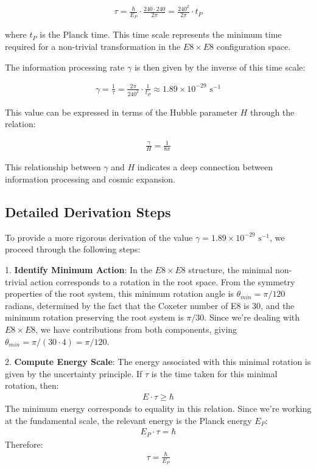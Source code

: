 \documentclass[11pt,english,twoside]{article}
\begin{document}
\begin{align}
    \tau = \frac{\hbar}{E_P} \cdot \frac{240 \cdot 240}{2\pi} = \frac{240^2}{2\pi} \cdot t_P
\end{align}

where $t_P$ is the Planck time. This time scale represents the minimum time required for a non-trivial transformation in the $E8\times E8$ configuration space.

The information processing rate $\gamma$ is then given by the inverse of this time scale:

\begin{align}
    \gamma = \frac{1}{\tau} = \frac{2\pi}{240^2} \cdot \frac{1}{t_P} \approx 1.89 \times 10^{-29} \text{ s}^{-1}
\end{align}

This value can be expressed in terms of the Hubble parameter $H$ through the relation:

\begin{align}
    \frac{\gamma}{H} = \frac{1}{8\pi}
\end{align}

This relationship between $\gamma$ and $H$ indicates a deep connection between information processing and cosmic expansion.

\subsection{Detailed Derivation Steps}

To provide a more rigorous derivation of the value $\gamma = 1.89 \times 10^{-29} \text{ s}^{-1}$, we proceed through the following steps:

1. \textbf{Identify Minimum Action}: In the $E8\times E8$ structure, the minimal non-trivial action corresponds to a rotation in the root space. From the symmetry properties of the root system, this minimum rotation angle is $\theta_{min} = \pi/120$ radians, determined by the fact that the Coxeter number of E8 is 30, and the minimum rotation preserving the root system is $\pi/30$. Since we're dealing with $E8\times E8$, we have contributions from both components, giving $\theta_{min} = \pi/(30 \cdot 4) = \pi/120$.

2. \textbf{Compute Energy Scale}: The energy associated with this minimal rotation is given by the uncertainty principle. If $\tau$ is the time taken for this minimal rotation, then:
\begin{align}
E \cdot \tau \geq \hbar
\end{align}
The minimum energy corresponds to equality in this relation. Since we're working at the fundamental scale, the relevant energy is the Planck energy $E_P$:
\begin{align}
E_P \cdot \tau = \hbar
\end{align}
Therefore:
\begin{align}
\tau = \frac{\hbar}{E_P}
\end{align}
\end{document}
